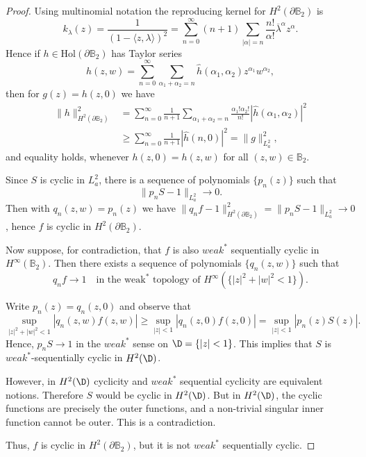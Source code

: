 \documentclass{article}
\numberwithin{equation}{section}
\newcommand{\la}{\langle}
\newcommand{\ra}{\rangle}
\begin{document}
\begin{proof} Using multinomial notation the reproducing kernel for $H^2(\partial \mathbb B_2)$ is $$k_\lambda(z)=\frac{1}{(1-\la z,\lambda\ra)^2}=\sum_{n=0}^\infty (n+1) \sum_{|\alpha|=n} \frac{n!}{\alpha !} \overline{\lambda}^\alpha z^\alpha.$$
Hence if $h\in \mathrm{Hol}(\partial \mathbb B_2)$ has Taylor series 
$$h(z,w)=\sum_{n=0}^\infty \sum_{\alpha_1+\alpha_2=n} \hat h(\alpha_1,\alpha_2) z^{\alpha_1}w^{\alpha_2},$$
then for $g(z)=h(z,0)$ we have
\begin{align*}\|h\|^2_{H^2(\partial \mathbb B_2)}&= \sum_{n=0}^\infty \frac{1}{n+1}\sum_{\alpha_1+\alpha_2=n} \frac{\alpha_1! \alpha_2!}{n!}| \hat h(\alpha_1,\alpha_2)|^2\\
&\ge   \sum_{n=0}^\infty \frac{1}{n+1}  |\hat h(n,0)|^2 = \|g\|^2_{L^2_a},\end{align*}
and equality holds, whenever $h(z,0)=h(z,w)$ for all $(z,w)\in \mathbb B_2$.

Since $S$ is cyclic in $L^2_a$, there is a sequence of polynomials $\{p_{n}(z)\}$ such that
\[
\| p_{n} S- 1 \|_{L^{2}_{a}} \longrightarrow 0.
\]
Then with $q_n(z,w)=p_n(z)$ we have $\|q_nf-1\|^2_{H^2(\partial \mathbb B_2)}=\| p_{n} S- 1 \|_{L^{2}_{a}} \longrightarrow 0$, hence $f$ is cyclic in $H^2(\partial \mathbb{B}_{2})$.




Now suppose, for contradiction, that $f$ is also $weak^\ast$ sequentially cyclic in $H^\infty(\mathbb B_2)$. Then there exists a sequence of polynomials $\{q_{n}(z,w)\}$ such that
\[
q_{n} f \longrightarrow 1
\quad \text{in the weak}^\ast \text{ topology of } H^\infty(\{ |z|^{2} + |w|^{2} < 1 \}).
\]

Write $p_n(z)=q_n(z,0)$ and observe that
\[
\sup_{|z|^{2}+|w|^{2}<1} |q_{n}(z,w) f(z,w)|
\geq
\sup_{|z|<1} |q_{n}(z,0) f(z,0)|
=
\sup_{|z|<1} |p_{n}(z) S(z)|.
\]
Hence, $p_{n} S \to 1$ in the $weak^\ast$ sense on $\D=\{|z|<1\}$. 
This implies that $S$ is $weak^\ast$-sequentially cyclic in $H^{2}(\D)$.

However, in $H^{2}(\D)$ cyclicity and $weak^\ast$ sequential cyclicity are equivalent notions. Therefore $S$ would be cyclic in $H^{2}(\D)$. But in $H^{2}(\D)$, the cyclic functions are precisely the outer functions, and a non-trivial singular inner function cannot be outer. This is a contradiction.

Thus, $f$ is cyclic in $H^{2}(\partial \mathbb{B}_{2})$, but it is not $weak^\ast$ sequentially cyclic.
\end{proof} 
\end{document}
